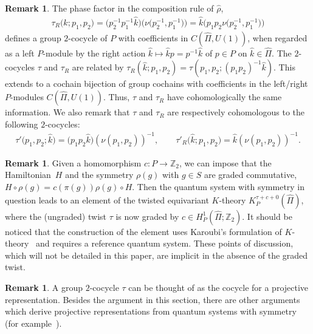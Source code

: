 \documentclass[pdftex]{sigma}
\theoremstyle{definition}
\newtheorem{rem}[thm]{Remark}
\newcommand{\Z}{\mathbb{Z}}
\begin{document}
\begin{rem} %
The phase factor in the composition rule of $\hat{\rho}$,
\begin{gather*}
\tau_R\big(\hat{k}; p_1, p_2\big)
= \big(p_2^{-1}p_1^{-1}\hat{k}\big)\big(\nu\big(p_2^{-1}, p_1^{-1}\big)\big)
= \hat{k}\big(p_1p_2\nu\big(p_2^{-1}, p_1^{-1}\big)\big)
\end{gather*}
def\/ines a group $2$-cocycle of $P$ with coef\/f\/icients in $C(\hat{\Pi}, U(1))$, when regarded as a left $P$-module by the right action $\hat{k} \mapsto \hat{k}p = p^{-1}\hat{k}$ of $p \in P$ on $\hat{k} \in \hat{\Pi}$. The $2$-cocycles $\tau$ and $\tau_R$ are related by $\tau_R(\hat{k}; p_1, p_2) = \tau(p_1, p_2; (p_1p_2)^{-1}\hat{k})$. This extends to a cochain bijection of group cochains with coef\/f\/icients in the left/right $P$-modules $C(\hat{\Pi}, U(1))$. Thus, $\tau$ and $\tau_R$ have cohomologically the same information. We also remark that $\tau$ and $\tau_R$ are respectively cohomologous to the following $2$-cocycles:
\begin{gather*}
\tau'\big(p_1, p_2; \hat{k}\big) = \big(p_1p_2\hat{k}\big)(\nu(p_1, p_2))^{-1}, \qquad
\tau'_R\big(\hat{k}; p_1, p_2\big) = \hat{k}(\nu(p_1, p_2))^{-1}.
\end{gather*}
\end{rem}

\begin{rem} \label{rem:grading}
Given a homomorphism $c \colon P \to \Z_2$, we can impose that the Hamiltonian~$H$ and the symmetry $\rho(g)$ with $g \in S$ are graded commutative,
$H \circ \rho(g) = c(\pi(g)) \rho(g) \circ H$. Then the quantum system with symmetry in question leads to an element of the twisted equivariant $K$-theory $K^{\tau + c + 0}_P(\hat{\Pi})$, where the (ungraded) twist $\tau$ is now graded by $c \in H^1_P(\hat{\Pi}; \Z_2)$. It should be noticed that the construction of the element uses Karoubi's formulation of $K$-theory~\cite{Kar} and requires a reference quantum system. These points of discussion, which will not be detailed in this paper, are implicit in the absence of the graded twist.
\end{rem}

\begin{rem}
A group $2$-cocycle $\tau$ can be thought of as the cocycle for a projective representation. Besides the argument in this section, there are other arguments which derive projective representations from quantum systems with symmetry (for example~\cite{KKW1, KKW2}).
\end{rem}
\end{document}
